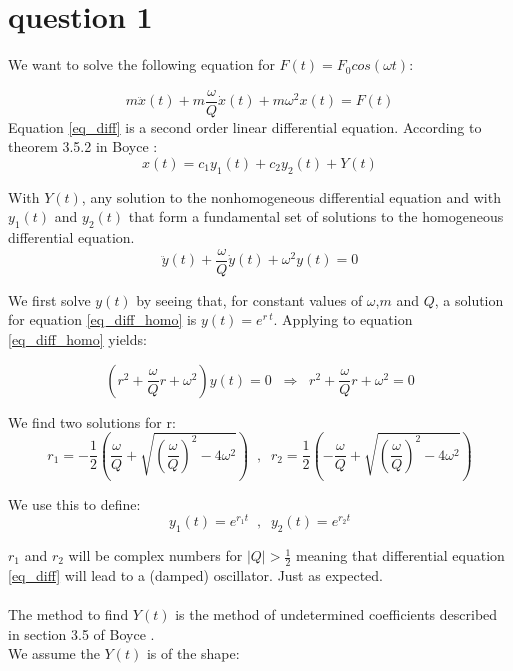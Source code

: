 \section{question 1}

We want to solve the following equation for $F(t) = F_0 cos(\omega t)$:

\begin{equation}
	m \ddot{x}(t) + m \frac{\omega}{Q} \dot{x}(t) + m \omega^2 x(t) = F(t)
	\label{eq_diff}
\end{equation}
Equation \ref{eq_diff} is a second order linear differential equation. According to theorem 3.5.2 in Boyce \cite{Boyce}:
\begin{equation}
	x(t) = c_1 y_1(t) + c_2 y_2(t) + Y(t)
	\label{eq_x_1_emtpy}
\end{equation}

With $Y(t)$, any solution to the nonhomogeneous differential equation and with $y_1(t)$ and $y_2(t)$ that form a fundamental set of solutions to the homogeneous differential equation.
\begin{equation}
	\ddot{y}(t) + \frac{\omega}{Q} \dot{y}(t) + \omega^2 y(t) = 0
	\label{eq_diff_homo}
\end{equation}

We first solve $y(t)$ by seeing that, for constant values of $\omega$,$m$ and $Q$, a solution for equation \ref{eq_diff_homo} is  $y(t) = e^{r \: t}$. Applying to equation \ref{eq_diff_homo} yields:

\begin{equation}
	(r^2 + \frac{\omega}{Q} r + \omega^2) y(t) = 0 \; \; \Rightarrow \; \; r^2 + \frac{\omega}{Q} r + \omega^2 = 0
	\label{eq_characteristic}
\end{equation}

We find two solutions for r:
\begin{equation*}
	r_1 = - \frac{1}{2} \left( \frac{\omega}{Q} + \sqrt{\left( \frac{\omega}{Q} \right)^2 -4 \omega^2} \right) \; \; , \; \; r_2 = \frac{1}{2} \left( -\frac{\omega}{Q} + \sqrt{\left( \frac{\omega}{Q} \right)^2 -4 \omega^2} \right)
\end{equation*}

We use this to define:
\begin{equation*}
	y_1(t) = e^{r_1 t} \; \; , \; \; y_2(t) = e^{r_2 t}
\end{equation*}

$r_1$ and $r_2$ will be complex numbers for $\mid Q \mid > \frac{1}{2}$ meaning that differential equation \ref{eq_diff} will lead to a (damped) oscillator. Just as expected.\\
\\
The method to find $Y(t)$ is the method of undetermined coefficients described in section 3.5 of Boyce \cite{Boyce}.\\
We assume the $Y(t)$ is of the shape:

